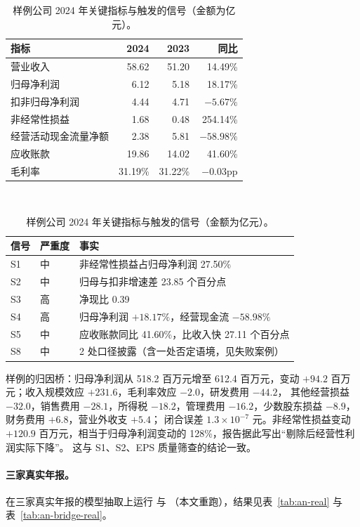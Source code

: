 \begin{table}[t]
\centering
\caption{样例公司 2024 年关键指标与触发的信号（金额为亿元）。}
\label{tab:an-sample}
\small
\begin{tabular}{lrrr}
\toprule
指标 & 2024 & 2023 & 同比 \\
\midrule
营业收入 & 58.62 & 51.20 & 14.49\% \\
归母净利润 & 6.12 & 5.18 & 18.17\% \\
扣非归母净利润 & 4.44 & 4.71 & $-5.67\%$ \\
非经常性损益 & 1.68 & 0.48 & 254.14\% \\
经营活动现金流量净额 & 2.38 & 5.81 & $-58.98\%$ \\
应收账款 & 19.86 & 14.02 & 41.60\% \\
毛利率 & 31.19\% & 31.22\% & $-0.03$pp \\
\bottomrule
\end{tabular}
\\[6pt]
\begin{tabularx}{\linewidth}{l l X}
\toprule
信号 & 严重度 & 事实 \\
\midrule
S1 & 中 & 非经常性损益占归母净利润 27.50\% \\
S2 & 中 & 归母与扣非增速差 23.85 个百分点 \\
S3 & 高 & 净现比 0.39 \\
S4 & 高 & 归母净利润 $+18.17\%$，经营现金流 $-58.98\%$ \\
S5 & 中 & 应收账款同比 41.60\%，比收入快 27.11 个百分点 \\
S8 & 中 & 2 处口径披露（含一处否定语境，见失败案例） \\
\bottomrule
\end{tabularx}
\end{table}

样例的归因桥：归母净利润从 518.2 百万元增至 612.4 百万元，变动 $+94.2$ 百万元；收入规模效应 $+231.6$，毛利率效应 $-2.0$，研发费用 $-44.2$，
其他经营损益 $-32.0$，销售费用 $-28.1$，所得税 $-18.2$，管理费用 $-16.2$，少数股东损益 $-8.9$，财务费用 $+6.8$，营业外收支 $+5.4$；
闭合误差 $1.3\times10^{-7}$ 元。非经常性损益变动 $+120.9$ 百万元，相当于归母净利润变动的 128\%，报告据此写出“剔除后经营性利润实际下降”。
这与 S1、S2、EPS 质量筛查的结论一致。

\paragraph{三家真实年报。}
在三家真实年报的模型抽取上运行  与 （本文重跑），结果见表~\ref{tab:an-real} 与表~\ref{tab:an-bridge-real}。

